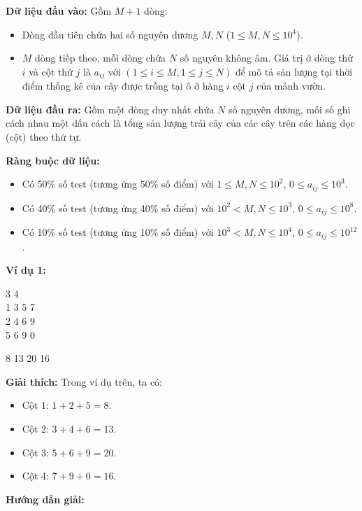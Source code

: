 \documentclass[12pt]{scrartcl}  %
\begin{document}
\textbf{Dữ liệu đầu vào:}
Gồm $M + 1$ dòng:
\begin{itemize}
    \item Dòng đầu tiên chứa hai số nguyên dương $M, N$ ($1 \leq M, N \leq 10^4$).
    \item $M$ dòng tiếp theo, mỗi dòng chứa $N$ số nguyên không âm. Giá trị ở dòng thứ $i$ và cột thứ $j$ là $a_{ij}$ với $(1 \leq i \leq M, 1 \leq j \leq N)$ để mô tả sản lượng tại thời điểm thống kê của cây được trồng tại ô ở hàng $i$ cột $j$ của mảnh vườn. 
\end{itemize}

\textbf{Dữ liệu đầu ra:}
Gồm một dòng duy nhất chứa $N$ số nguyên dương, mỗi số ghi cách nhau một dấu cách là tổng sản lượng trái cây của các cây trên các hàng dọc (cột) theo thứ tự. 

\textbf{Ràng buộc dữ liệu:}
\begin{itemize}
    \item Có 50\% số test (tương ứng 50\% số điểm) với $1 \leq M, N \leq 10^2$, $0 \leq a_{ij} \leq 10^3$.
    \item Có 40\% số test (tương ứng 40\% số điểm) với $10^2 < M, N \leq 10^3$, $0 \leq a_{ij} \leq 10^8$.
    \item Có 10\% số test (tương ứng 10\% số điểm) với $10^3 < M, N \leq 10^4$, $0 \leq a_{ij} \leq 10^{12}$.
\end{itemize}

\textbf{Ví dụ 1:}
\begin{tcolorbox}[colback=gray!5!white, colframe=blue!50!black, title=Input]
3 4\\
1 3 5 7\\
2 4 6 9\\
5 6 9 0
\end{tcolorbox}
\begin{tcolorbox}[colback=gray!5!white, colframe=green!50!black, title=Output]
8 13 20 16
\end{tcolorbox}

\textbf{Giải thích:}
Trong ví dụ trên, ta có:
\begin{itemize}
    \item Cột 1: $1 + 2 + 5 = 8$.
    \item Cột 2: $3 + 4 + 6 = 13$.
    \item Cột 3: $5 + 6 + 9 = 20$.
    \item Cột 4: $7 + 9 + 0 = 16$. 
\end{itemize}

\textbf{Hướng dẫn giải:}
\end{document}
